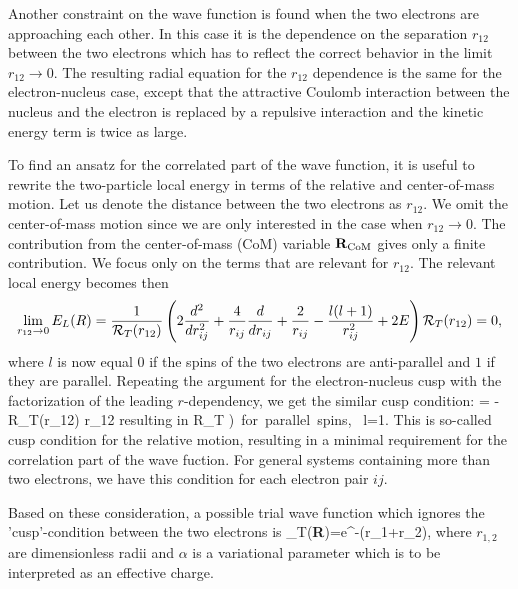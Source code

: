 Another constraint on the wave function is found when the  two
electrons are approaching each other. In this case it is the dependence
on the separation $r_{12}$ between the two electrons which has to
reflect the correct behavior in the limit $r_{12} \rightarrow 0$.
The resulting radial equation for the $r_{12}$ dependence is the
same for the electron-nucleus case, except that the attractive 
Coulomb interaction between the nucleus and the electron is
replaced by a repulsive interaction and the kinetic energy term
is twice as large. 

To find an ansatz for the correlated part of the wave function, it is useful to rewrite the two-particle
local energy in terms of the relative and center-of-mass motion. 
Let us denote the distance between the two electrons as
$r_{12}$. We omit the center-of-mass motion since we are only interested in the case when 
$r_{12} \rightarrow 0$. The contribution from the center-of-mass (CoM) variable ${\bf R}_{\mathrm{CoM}}$ 
gives only a finite contribution.  
We focus only on the terms that are relevant for $r_{12}$. The relevant local energy becomes then
\[
\lim_{r_{12} \rightarrow 0}E_L(R)=
    \frac{1}{{\cal R}_T(r_{12})}\left(2\frac{d^2}{dr_{ij}^2}+\frac{4}{r_{ij}}\frac{d}{dr_{ij}}+
\frac{2}{r_{ij}}-\frac{l(l+1)}{r_{ij}^2}+2E
\right){\cal R}_T(r_{12}) = 0,
\]
where $l$ is now equal $0$ if the spins of the two electrons are
anti-parallel and $1$ if they are parallel. Repeating the argument for
the electron-nucleus cusp with the factorization of the leading
$r$-dependency, we get the similar cusp condition:
\bdm
{} = -
{\cal R}_T(r_{12})\qquad
r_{12}
\edm
resulting in
\bdm
{\cal R}_T  \propto
{}
{)}{\mbox{ for parallel spins, } l=1}.
\edm
This is so-called cusp condition for the relative motion, resulting in a minimal requirement
for the correlation part of the wave fuction.
For general systems containing more than two electrons, we have this
condition for each electron pair $ij$.

Based on these consideration, a possible trial wave function which ignores
the 'cusp'-condition between the two electrons is 
\be
   \psi_T({\bf R})=e^{-\alpha(r_1+r_2)},
    \label{eq:wavehelium1}
\ee
where $r_{1,2}$ are dimensionless radii and $\alpha$ is a variational
parameter which is to be interpreted as an effective charge.

